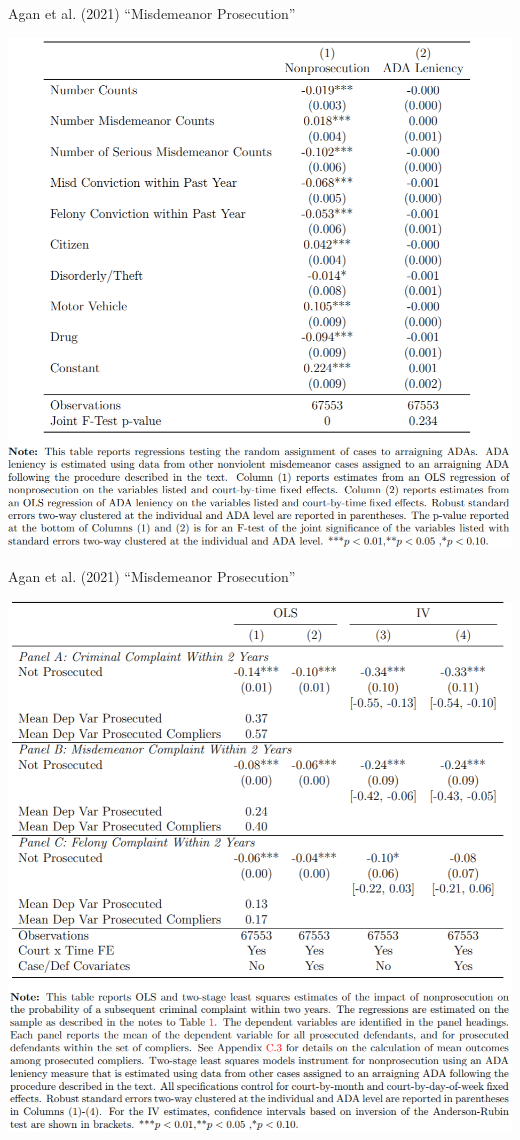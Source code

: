 \documentclass{beamer}
\begin{document}
\begin{frame}{Agan et al. (2021) ``Misdemeanor Prosecution''}
\vspace{-0.3cm}
\begin{center}
\includegraphics[scale=0.45]{./lecture_includes/agan_balance.png}
\end{center}
\end{frame}

\begin{frame}{Agan et al. (2021) ``Misdemeanor Prosecution''}
\vspace{-0.3cm}
\begin{center}
\includegraphics[scale=0.45]{./lecture_includes/agan_SS.png}
\end{center}
\end{frame}
\end{document}
